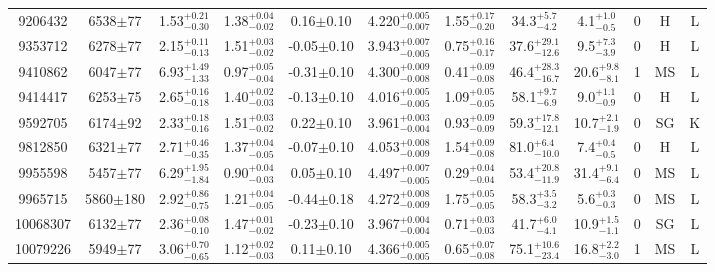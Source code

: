 \begin{longtable}{c|ccccc|ccc|ccc}
9206432 & 6538$\pm$77    & 1.53$_{-0.30}^{+0.21}$    & 1.38$_{-0.02}^{+0.04}$ & 0.16$\pm$0.10     & 4.220$_{-0.007}^{+0.005}$ & 1.55$_{-0.20}^{+0.17}$ & 34.3$_{-4.2}^{+5.7}$      & 4.1$_{-0.5}^{+1.0}$      & 0 &        H & L \\
9353712 & 6278$\pm$77    & 2.15$_{-0.13}^{+0.11}$    & 1.51$_{-0.02}^{+0.03}$ & -0.05$\pm$0.10    & 3.943$_{-0.005}^{+0.007}$ & 0.75$_{-0.17}^{+0.16}$ & 37.6$_{-12.6}^{+29.1}$    & 9.5$_{-3.9}^{+7.3}$      & 0 &        H & L \\
9410862 & 6047$\pm$77    & 6.93$_{-1.33}^{+1.49}$    & 0.97$_{-0.04}^{+0.05}$ & -0.31$\pm$0.10    & 4.300$_{-0.008}^{+0.009}$ & 0.41$_{-0.08}^{+0.09}$ & 46.4$_{-16.7}^{+28.3}$    & 20.6$_{-8.1}^{+9.8}$     & 1 &        MS & L \\
9414417 & 6253$\pm$75    & 2.65$_{-0.18}^{+0.16}$    & 1.40$_{-0.03}^{+0.02}$ & -0.13$\pm$0.10    & 4.016$_{-0.005}^{+0.005}$ & 1.09$_{-0.05}^{+0.05}$ & 58.1$_{-6.9}^{+9.7}$      & 9.0$_{-0.9}^{+1.1}$      & 0 &        H & L \\
9592705 & 6174$\pm$92    & 2.33$_{-0.16}^{+0.18}$    & 1.51$_{-0.02}^{+0.03}$ & 0.22$\pm$0.10     & 3.961$_{-0.004}^{+0.003}$ & 0.93$_{-0.09}^{+0.09}$ & 59.3$_{-12.1}^{+17.8}$    & 10.7$_{-1.9}^{+2.1}$     & 0 &        SG & K \\
9812850 & 6321$\pm$77    & 2.71$_{-0.35}^{+0.46}$    & 1.37$_{-0.05}^{+0.04}$ & -0.07$\pm$0.10    & 4.053$_{-0.009}^{+0.008}$ & 1.54$_{-0.08}^{+0.09}$ & 81.0$_{-10.0}^{+6.4}$      & 7.4$_{-0.5}^{+0.4}$     & 0 &        H & L \\
9955598 & 5457$\pm$77    & 6.29$_{-1.84}^{+1.95}$    & 0.90$_{-0.03}^{+0.04}$ & 0.05$\pm$0.10     & 4.497$_{-0.005}^{+0.007}$ & 0.29$_{-0.04}^{+0.04}$ & 53.4$_{-11.9}^{+20.8}$    & 31.4$_{-6.4}^{+9.1}$     & 0 &        MS & L \\
9965715 & 5860$\pm$180   & 2.92$_{-0.75}^{+0.86}$    & 1.21$_{-0.05}^{+0.04}$ & -0.44$\pm$0.18    & 4.272$_{-0.009}^{+0.008}$ & 1.75$_{-0.05}^{+0.05}$ & 58.3$_{-3.2}^{+3.5}$      & 5.6$_{-0.3}^{+0.3}$      & 0 &        MS & L \\
10068307 & 6132$\pm$77   & 2.36$_{-0.10}^{+0.08}$    & 1.47$_{-0.02}^{+0.01}$ & -0.23$\pm$0.10    & 3.967$_{-0.004}^{+0.004}$ & 0.71$_{-0.03}^{+0.03}$ & 41.7$_{-4.1}^{+6.0}$      & 10.9$_{-1.1}^{+1.5}$     & 0 &        SG & L \\
10079226 & 5949$\pm$77   & 3.06$_{-0.65}^{+0.70}$    & 1.12$_{-0.03}^{+0.02}$ & 0.11$\pm$0.10     & 4.366$_{-0.005}^{+0.005}$ & 0.65$_{-0.08}^{+0.07}$ & 75.1$_{-23.4}^{+10.6}$    & 16.8$_{-3.0}^{+2.2}$     & 1 &        MS & L \\

\end{longtable}
